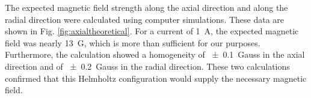 The expected magnetic field strength along the axial direction and along the radial direction were calculated using computer simulations. These data are shown in Fig. \ref{fig:axialtheoretical}. For a current of \SI{1}{ A}, the expected magnetic field was nearly \SI{13}{ G}, which is more than sufficient for our purposes. Furthermore, the calculation showed a homogeneity of \SI{\pm 0.1}{ Gauss} in the axial direction and of \SI{\pm 0.2}{ Gauss} in the radial direction. These two calculations confirmed that this Helmholtz configuration would supply the necessary magnetic field.

\begin{figure}[htpb]
	\centering
	\begin{minipage}{.49\textwidth}
	\centering
	\end{minipage}
	\begin{minipage}{.49\textwidth}
	\centering
	\vspace{.5cm}
\end{minipage}
\end{figure}
